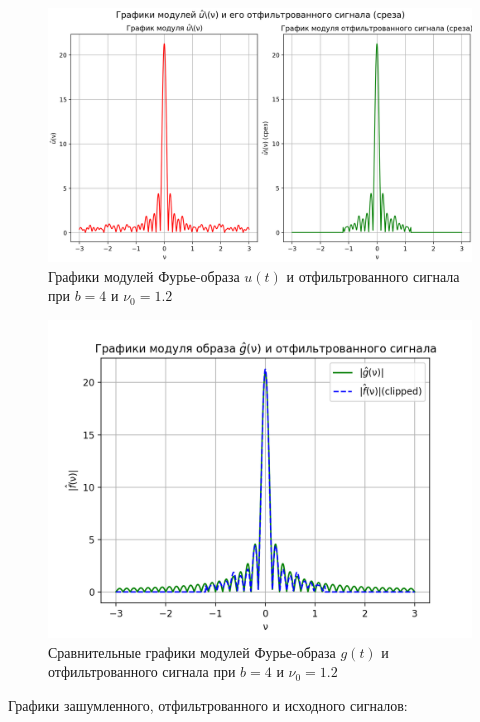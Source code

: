 \begin{figure}[ht!]
    \centering
    \includegraphics[scale=0.55]{media/1 task/high_freq/Fourier_Image_4_-1,1981981981981982.png}
    \caption{Графики модулей Фурье-образа $u(t)$ и отфильтрованного сигнала при $b=4$ и $\nu_0=1.2$}
    \label{fig:four_4_12}
\end{figure}

\begin{figure}[ht!]
    \centering
    \includegraphics[scale=0.55]{media/1 task/high_freq/Fourier_Image_Comparison_4_-1,1981981981981982.png}
    \caption{Сравнительные графики модулей Фурье-образа $g(t)$ и отфильтрованного сигнала при $b=4$ и $\nu_0=1.2$}
    \label{fig:fourc_4_12}
\end{figure}

\clearpage

Графики зашумленного, отфильтрованного и исходного сигналов:

